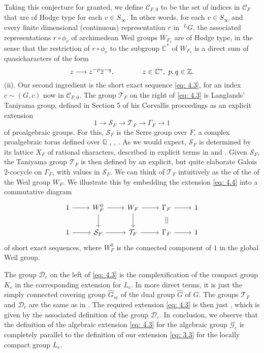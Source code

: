 \documentclass[preprint,12pt, leqno]{elsarticle}
\newcommand{\mQ}{\mathbb{Q}}
\newcommand{\mC}{\mathbb{C}}
\newcommand{\cD}{\mathcal{D}}
\newcommand{\cT}{\mathcal{T}}
\newcommand{\cC}{\mathcal{C}}
\newcommand{\cS}{\mathcal{S}}
\newcommand{\LG}{\;^LG}
\newcommand{\whG}{\widehat{G}}
\newcommand{\SP}{\mkern70mu }
\numberwithin{equation}{section}
\theoremstyle{named}
\begin{document}
Taking this conjecture for granted, we define $\cC_{F, 0}$ to be the set of indices in $\cC_F$ that are of Hodge type for each $v\in S_{\infty}$. In other words, for each $v\in S_{\infty}$ and every finite dimensional (continuous) representation $r$ in $\LG$, the associated representations $r\circ\phi_v$ of archimedean Weil groups $W_{F_v}$ are of Hodge type, in the sense that the restriction of $r\circ\phi_v$ to the subgroup $\mC^*$ of $W_{F_v}$ is a direct sum of quasicharacters of the form
\begin{equation*}
    z \longrightarrow z^{-p}\overline{z}^{-q}, \SP z\in\mathbb{C^*}, \;p, q\in\mathbb{Z}.
\end{equation*}
(ii). Our second ingredient is the short exact sequence \eqref{eq: 4.3}, for an index $c\sim (G, c)$ now in $\cC_{F, 0}$. The group $\cT_F$ on the right of \eqref{eq: 4.3} is Langlands' Taniyama group, defined in Section 5 of his Corvallis proceedings \cite{L4} as an explicit extension
\begin{equation}\label{eq: 4.4}
    1 \longrightarrow \mathcal{S}_F \longrightarrow \mathcal{T}_F \longrightarrow \Gamma_F \longrightarrow 1
\end{equation}of proalgebraic groups. For this, $\cS_F$ is the Serre group over $F$, a complex proalgebraic torus defined over $\mQ$ \cite{Se1}, \cite{Se2}, \cite{L4}. As we would expect, $\cS_F$ is determined by its lattice $X_F$ of rational characters, described in explicit terms in \cite[Section 5]{L4} and \cite[Section 3]{Se2}. Given $\cS_F$, the Taniyama group $\cT_F$ is then defined by an explicit, but quite elaborate Galois $2$-cocycle on $\Gamma_F$, with values in $\cS_F$. We can think of $\cT_F$ intuitively as the  of the  of the Weil group $W_F$. We illustrate this by embedding the extension \eqref{eq: 4.4} into a commutative diagram
\begin{equation}\label{eq: 4.5}
    \begin{tikzcd}
    1 \ar[r] & W_F^0 \ar[r] \ar[d] & W_F \ar[r]\ar[d] & \Gamma_F \ar[r] \ar[d, phantom, "||"]& 1\\
    1 \ar[r] & \mathcal{S}_F \ar[r] & \cT_F \ar[r] & \Gamma_F \ar[r] & 1       
    \end{tikzcd}
\end{equation}
of short exact sequences, where $W_F^0$ is the connected component of $1$ in the global Weil group.

The group $\cD_c$ on the left of \eqref{eq: 4.3} is the complexification of the compact group $K_{c}$ in the corresponding extension for $L_c$. In more direct terms, it is just the simply connected covering group $\whG_{sc}$ of the dual group $\whG$ of $G$. The groups $\cT_F$ and $\cD_c$ are the same as in \cite[Section 6]{N2}. The required extension \eqref{eq: 4.3} is then just \cite[(6.3)]{N2}, which is given by the associated definition \cite[(6.4)]{N2} of the group $\cD_c$. In conclusion, we observe that the definition \cite[(6.4)]{N2} of the algebraic extension \eqref{eq: 4.3} for the algebraic group $\mathcal{G}_c$ is completely parallel to the definition \cite[(4.4)]{N2} of our extension \eqref{eq: 3.3} for the locally compact group $L_c$.
\end{document}
